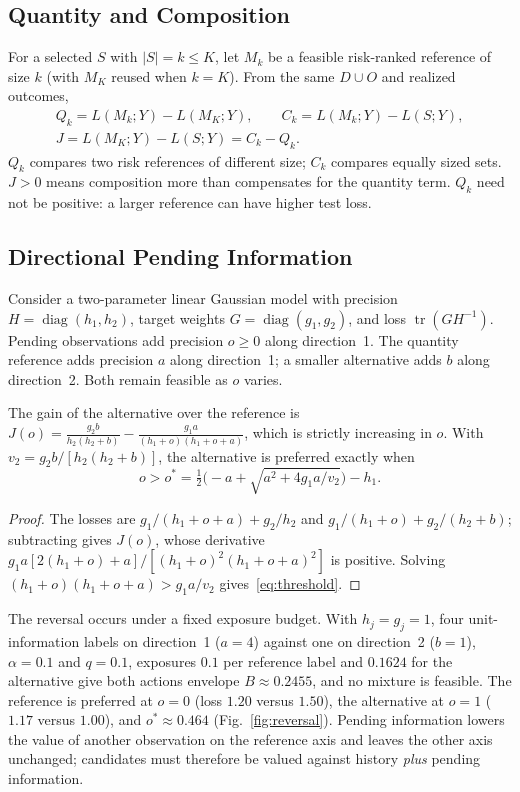 \documentclass[runningheads]{llncs}
\begin{document}
\subsection{Quantity and Composition}
For a selected $S$ with $|S|=k\le K$, let $M_k$ be a feasible risk-ranked reference of size $k$ (with $M_K$ reused when $k=K$). From the same $D\cup O$ and realized outcomes,
\begin{equation}
\begin{gathered}
 Q_k=L(M_k;Y)-L(M_K;Y),\qquad C_k=L(M_k;Y)-L(S;Y),\\
 J=L(M_K;Y)-L(S;Y)=C_k-Q_k.
\end{gathered}
 \label{eq:decomposition}
\end{equation}
$Q_k$ compares two risk references of different size; $C_k$ compares equally sized sets. $J>0$ means composition more than compensates for the quantity term. $Q_k$ need not be positive: a larger reference can have higher test loss.

\subsection{Directional Pending Information}
Consider a two-parameter linear Gaussian model with precision $H=\operatorname{diag}(h_1,h_2)$, target weights $G=\operatorname{diag}(g_1,g_2)$, and loss $\operatorname{tr}(GH^{-1})$. Pending observations add precision $o\ge0$ along direction~1. The quantity reference adds precision $a$ along direction~1; a smaller alternative adds $b$ along direction~2. Both remain feasible as $o$ varies.

\begin{proposition}
The gain of the alternative over the reference is
$J(o)=\frac{g_2b}{h_2(h_2+b)}-\frac{g_1a}{(h_1+o)(h_1+o+a)}$, which is strictly increasing in $o$. With $v_2=g_2b/[h_2(h_2+b)]$, the alternative is preferred exactly when
\begin{equation}
 o>o^*=\tfrac12\big(-a+\sqrt{a^2+4g_1a/v_2}\big)-h_1 .\label{eq:threshold}
\end{equation}
\end{proposition}
\begin{proof}
The losses are $g_1/(h_1+o+a)+g_2/h_2$ and $g_1/(h_1+o)+g_2/(h_2+b)$; subtracting gives $J(o)$, whose derivative $g_1a[2(h_1+o)+a]/[(h_1+o)^2(h_1+o+a)^2]$ is positive. Solving $(h_1+o)(h_1+o+a)>g_1a/v_2$ gives~\eqref{eq:threshold}.
\end{proof}
The reversal occurs under a fixed exposure budget. With $h_j=g_j=1$, four unit-information labels on direction~1 ($a=4$) against one on direction~2 ($b=1$), $\alpha=0.1$ and $q=0.1$, exposures $0.1$ per reference label and $0.1624$ for the alternative give both actions envelope $B\approx0.2455$, and no mixture is feasible. The reference is preferred at $o=0$ (loss $1.20$ versus $1.50$), the alternative at $o=1$ ($1.17$ versus $1.00$), and $o^*\approx0.464$ (Fig.~\ref{fig:reversal}). Pending information lowers the value of another observation on the reference axis and leaves the other axis unchanged; candidates must therefore be valued against history \emph{plus} pending information.
\end{document}
